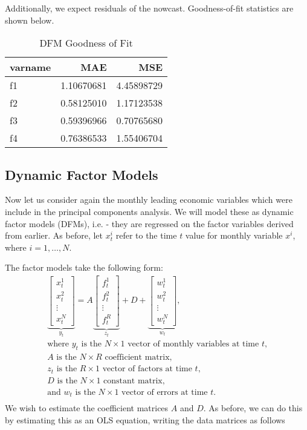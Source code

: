 \documentclass[11pt, letterpaper]{article}\usepackage[]{graphicx}\usepackage[]{color}
\begin{document}
Additionally, we expect residuals of the nowcast. Goodness-of-fit statistics are shown below.
\begin{table}[H]
\centering
\begingroup\footnotesize
\begin{tabular}{lrr}
  \hline
varname & MAE & MSE \\ 
  \hline
f1 & 1.10670681 & 4.45898729 \\ 
  f2 & 0.58125010 & 1.17123538 \\ 
  f3 & 0.59396966 & 0.70765680 \\ 
  f4 & 0.76386533 & 1.55406704 \\ 
   \hline
\end{tabular}
\endgroup
\caption{DFM Goodness of Fit} 
\end{table}




\subsection{Dynamic Factor Models}
Now let us consider again the monthly leading economic variables which were include in the principal components analysis. We will model these as dynamic factor models (DFMs), i.e. - they are regressed on the factor variables derived from earlier. As before, let $x^i_t$ refer to the time $t$ value for monthly variable $x^i$, where $i = 1, \dots, N$.

The factor models take the following form:
\begin{align*}
\underbrace{\begin{bmatrix}
	x^1_t\\
	x^2_t\\
	\vdots \\
	x^N_t
\end{bmatrix}}_{y_t}
=
A
\underbrace{\begin{bmatrix}
	f^1_{t}\\
	f^2_{t}\\
	\vdots \\
	f^R_{t}
\end{bmatrix}}_{z_t}
+
D 
+
\underbrace{\begin{bmatrix}
	w^1_t\\
	w^2_t\\
	\vdots\\
	w^N_t
\end{bmatrix}}_{w_t},\\
\text{where $y_t$ is the $N \times 1$ vector of monthly variables at time $t$,}\\
\text{$A$ is the $N \times R$ coefficient matrix,}\\
\text{$z_t$ is the $R \times 1$ vector of factors at time $t$,}\\
\text{$D$ is the $N \times 1$ constant matrix,}\\
\text{and $w_t$ is the $N \times 1$ vector of errors at time $t$.}\\
\end{align*}
We wish to estimate the coefficient matrices $A$ and $D$. As before, we can do this by estimating this as an OLS equation, writing the data matrices as follows
\end{document}
